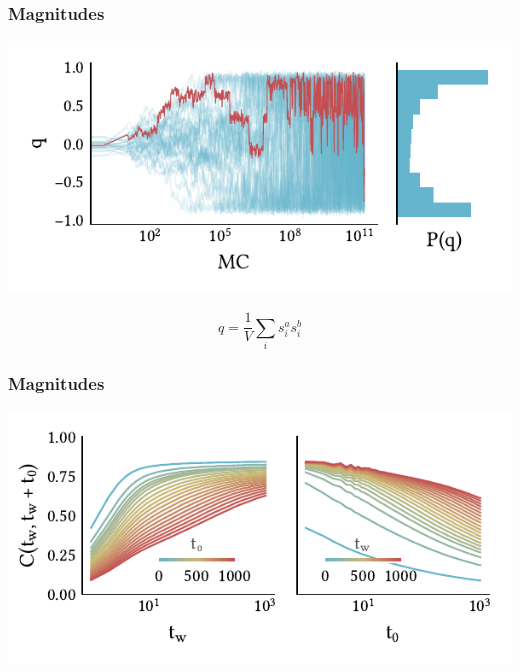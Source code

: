 \documentclass{beamer}
\begin{document}
\begin{frame}
  \frametitle{Magnitudes}
  \begin{center}
    \includegraphics{../study_cases/overlap/overlap_beamer.pdf}
  \end{center}
  \begin{equation*}
    q = \frac{1}{V} \sum_{i} s_i^a s_i^b
  \end{equation*}
\end{frame}


\begin{frame}
  \frametitle{Magnitudes}
  \begin{center}
    \includegraphics{../study_cases/corr_functional_dependence/corrfunction_beamer.pdf}
  \end{center}
  \begin{center}
  \end{center}
\end{frame}
\end{document}
